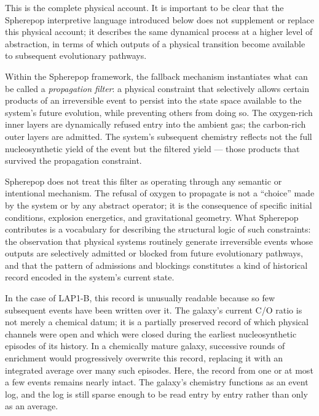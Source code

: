 \documentclass[12pt, a4paper]{article}
\theoremstyle{definition}
\begin{document}
This is the complete physical account. It is important to be clear that the
Spherepop interpretive language introduced below does not supplement or replace
this physical account; it describes the same dynamical process at a higher level
of abstraction, in terms of which outputs of a physical transition become
available to subsequent evolutionary pathways.

Within the Spherepop framework, the fallback mechanism instantiates what can
be called a \emph{propagation filter}: a physical constraint that selectively
allows certain products of an irreversible event to persist into the state
space available to the system's future evolution, while preventing others from
doing so. The oxygen-rich inner layers are dynamically refused entry into
the ambient gas; the carbon-rich outer layers are admitted. The system's
subsequent chemistry reflects not the full nucleosynthetic yield of the event
but the filtered yield --- those products that survived the propagation
constraint.

Spherepop does not treat this filter as operating through any semantic or
intentional mechanism. The refusal of oxygen to propagate is not a ``choice''
made by the system or by any abstract operator; it is the consequence of
specific initial conditions, explosion energetics, and gravitational geometry.
What Spherepop contributes is a vocabulary for describing the structural logic
of such constraints: the observation that physical systems routinely generate
irreversible events whose outputs are selectively admitted or blocked from
future evolutionary pathways, and that the pattern of admissions and blockings
constitutes a kind of historical record encoded in the system's current state.

In the case of LAP1-B, this record is unusually readable because so few
subsequent events have been written over it. The galaxy's current C/O ratio
is not merely a chemical datum; it is a partially preserved record of which
physical channels were open and which were closed during the earliest
nucleosynthetic episodes of its history. In a chemically mature galaxy,
successive rounds of enrichment would progressively overwrite this record,
replacing it with an integrated average over many such episodes. Here, the
record from one or at most a few events remains nearly intact. The galaxy's
chemistry functions as an event log, and the log is still sparse enough to
be read entry by entry rather than only as an average.

\end{document}
